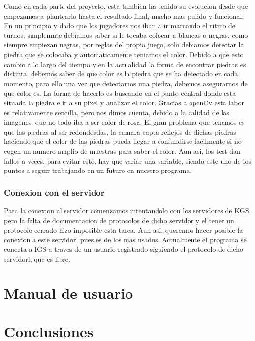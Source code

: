 \documentclass[12pt,a4paper]{report}
\begin{document}
Como en cada parte del proyecto, esta tambien ha tenido su evolucion desde que
empezamos a plantearlo hasta el resultado final, mucho mas pulido y funcional.
En un principio y dado que los jugadores nos iban a ir marcando el ritmo de
turnos, simplemnte debiamos saber si le tocaba colocar a blancas o negras, como
siempre empiezan negras, por reglas del propio juego, solo debiamos detectar la
piedra que se colocaba y automaticamente teniamos el color.  Debido a que esto
cambio a lo largo del tiempo y en la actualidad la forma de encontrar piedras es
distinta, debemos saber de que color es la piedra que se ha detectado en cada
momento, para ello una vez que detectamos una piedra, debemos asegurarnos de que
color es. La forma de hacerlo es buscando en el punto central donde esta situada
la piedra e ir a su pixel y analizar el color. Gracias a openCv esta labor es
relativamente sencilla, pero nos dimos cuenta, debido a la calidad de las
imagenes, que no todo iba a ser color de rosa. El gran problema que tenemos es
que las piedras al ser redondeadas, la camara capta reflejos de dichas piedras
haciendo que el color de las piedras pueda llegar a confundirse facilmente si no
cogen un numero amplio de muestras para saber el color. Aun asi, los test dan
fallos a veces, para evitar esto, hay que variar una variable, siendo este uno
de los puntos a seguir trabajando en un futuro en nuestro programa.


\subsection{Conexion con el servidor}

Para la conexion al servidor comenzamos intentandolo con los servidores de KGS,
pero la falta de documentacion de protocolos de dicho servidor y el tener un
protocolo cerrado hizo imposible esta tarea. Aun asi, queremos hacer posible la
conexion a este servidor, pues es de los mas usados. Actualmente el programa se
conecta a IGS a traves de un usuario registrado siguiendo el protocolo de dicho
servidorl, que es libre.


 
\chapter{Manual de usuario}



\chapter{Conclusiones}
\end{document}
